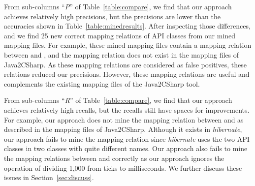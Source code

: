 From sub-columns ``\emph{P}'' of Table~\ref{table:compare}, we find
that our approach achieves relatively high precisions, but the
precisions are lower than the accuracies shown in
Table~\ref{table:minedresults}. After inspecting those differences,
and we find 25 new correct mapping relations of API classes from our
mined mapping files. For example, these mined mapping files contain
a mapping relation between  and
, and the mapping relation does not
exist in the mapping files of Java2CSharp. As these mapping
relations are considered as false positives, these relations reduced
our precisions. However, these mapping relations are useful and
complements the existing mapping files of the Java2CSharp tool.

From sub-columns ``\emph{R}'' of Table~\ref{table:compare}, we find
that our approach achieves relatively high recalls, but the recalls
still have spaces for improvements. For example, our approach does
not mine the mapping relation between
 and  as described in the mapping files of
Java2CSharp. Although it exists in \emph{hibernate}, our approach
fails to mine the mapping relation since \emph{hibernate} uses the
two API classes in two classes with quite different names. Our
approach also fails to mine the mapping relations between
 and 
correctly as our approach ignores the operation of dividing 1,000
from ticks to milliseconds. We further discuss these issues in
Section~\ref{sec:discuss}.

